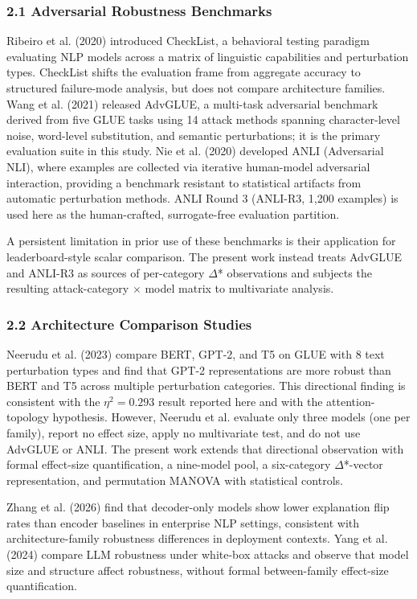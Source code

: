 
\subsubsection{2.1 Adversarial Robustness Benchmarks}

Ribeiro et al. (2020) introduced CheckList, a behavioral testing paradigm evaluating NLP models across a matrix of linguistic capabilities and perturbation types. CheckList shifts the evaluation frame from aggregate accuracy to structured failure-mode analysis, but does not compare architecture families. Wang et al. (2021) released AdvGLUE, a multi-task adversarial benchmark derived from five GLUE tasks using 14 attack methods spanning character-level noise, word-level substitution, and semantic perturbations; it is the primary evaluation suite in this study. Nie et al. (2020) developed ANLI (Adversarial NLI), where examples are collected via iterative human-model adversarial interaction, providing a benchmark resistant to statistical artifacts from automatic perturbation methods. ANLI Round 3 (ANLI-R3, 1,200 examples) is used here as the human-crafted, surrogate-free evaluation partition.

A persistent limitation in prior use of these benchmarks is their application for leaderboard-style scalar comparison. The present work instead treats AdvGLUE and ANLI-R3 as sources of per-category $\Delta$* observations and subjects the resulting attack-category $\times$ model matrix to multivariate analysis.

\subsubsection{2.2 Architecture Comparison Studies}

Neerudu et al. (2023) compare BERT, GPT-2, and T5 on GLUE with 8 text perturbation types and find that GPT-2 representations are more robust than BERT and T5 across multiple perturbation categories. This directional finding is consistent with the $\eta^{2}=0.293$ result reported here and with the attention-topology hypothesis. However, Neerudu et al. evaluate only three models (one per family), report no effect size, apply no multivariate test, and do not use AdvGLUE or ANLI. The present work extends that directional observation with formal effect-size quantification, a nine-model pool, a six-category $\Delta$*-vector representation, and permutation MANOVA with statistical controls.

Zhang et al. (2026) find that decoder-only models show lower explanation flip rates than encoder baselines in enterprise NLP settings, consistent with architecture-family robustness differences in deployment contexts. Yang et al. (2024) compare LLM robustness under white-box attacks and observe that model size and structure affect robustness, without formal between-family effect-size quantification.


